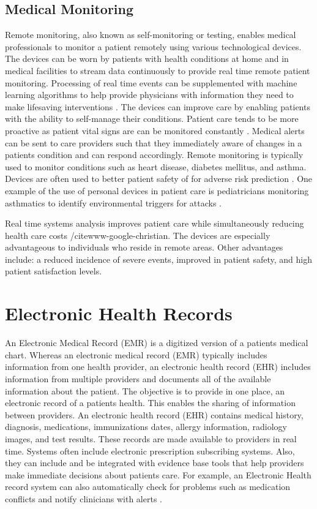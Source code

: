 \documentclass[sigconf]{acmart}
\begin{document}
\subsection{Medical Monitoring} 
Remote monitoring, also known as self-monitoring or testing, enables medical professionals to monitor a patient remotely using various technological devices. The devices can be worn by patients with health conditions at home and in medical facilities to stream data continuously to provide real time remote patient monitoring.  Processing of real time events can be supplemented with machine learning algorithms to help provide physicians with information they need to make lifesaving interventions \cite{www-google-McDonald}.  The devices can improve care by enabling patients with the ability to self-manage their conditions. Patient care tends to be more proactive as patient vital signs are can be monitored constantly \cite{McDonald}. Medical alerts can be sent to care providers such that they immediately aware of changes in a patients condition and can respond accordingly.  Remote monitoring is typically used to monitor conditions such as heart disease, diabetes mellitus, and asthma. Devices are often used to better patient safety of for adverse risk prediction \cite{McDonald}.  One example of the use of personal devices in patient care is pediatricians monitoring asthmatics to identify environmental triggers for attacks \cite{www-google-CIO}. 

Real time systems analysis improves patient care while simultaneously reducing health care costs /cite{www-google-christian}.  The devices are especially advantageous to individuals who reside in remote areas. Other advantages include: a reduced incidence of severe events, improved in patient safety, and high patient satisfaction levels. 


\section{Electronic Health Records}

An Electronic Medical Record (EMR) is a digitized version of a patients medical chart.  Whereas an electronic medical record (EMR) typically includes information from one health provider, an electronic health record (EHR) includes information from multiple providers and documents all of the available information about the patient.  The objective is to provide in one place, an electronic record of a patients health. This enables the sharing of information between providers. An electronic health record (EHR) contains medical history, diagnosis, medications, immunizations dates, allergy information, radiology images, and test results. These records are made available to providers in real time.  Systems often include electronic prescription subscribing systems. Also, they can include and be integrated with evidence base tools that help providers make immediate decisions about patients care. For example, an Electronic Health record system can also automatically check for problems such as medication conflicts and notify clinicians with alerts \cite{www-google-elec}.
\end{document}
